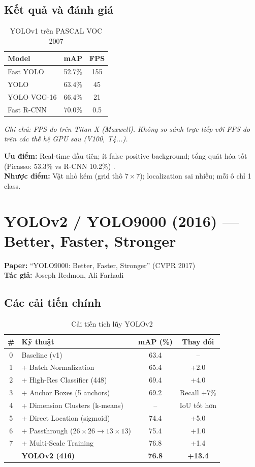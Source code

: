 \subsection{Kết quả và đánh giá}
\begin{table}[H]\centering
\caption{YOLOv1 trên PASCAL VOC 2007}
\begin{tabular}{lcc}\toprule
\textbf{Model} & \textbf{mAP} & \textbf{FPS} \\\midrule
Fast YOLO & 52.7\% & 155 \\
YOLO & 63.4\% & 45 \\
YOLO VGG-16 & 66.4\% & 21 \\
Fast R-CNN & 70.0\% & 0.5 \\\bottomrule
\end{tabular}
\end{table}

\textit{Ghi chú: FPS đo trên Titan X (Maxwell). Không so sánh trực tiếp với FPS đo trên các thế hệ GPU sau (V100, T4...).}

\textbf{Ưu điểm:} Real-time đầu tiên; ít false positive background; tổng quát hóa tốt (Picasso: 53.3\% vs R-CNN 10.2\%) \cite{yolov1}.\\
\textbf{Nhược điểm:} Vật nhỏ kém (grid thô $7 \times 7$); localization sai nhiều; mỗi ô chỉ 1 class.

\section{YOLOv2 / YOLO9000 (2016) --- Better, Faster, Stronger}
\textbf{Paper:} ``YOLO9000: Better, Faster, Stronger'' (CVPR 2017) \cite{yolov2}\\
\textbf{Tác giả:} Joseph Redmon, Ali Farhadi

\subsection{Các cải tiến chính}
\begin{table}[H]\centering
\caption{Cải tiến tích lũy YOLOv2}
\begin{tabular}{clcc}\toprule
\# & \textbf{Kỹ thuật} & \textbf{mAP (\%)} & \textbf{Thay đổi}\\\midrule
0 & Baseline (v1) & 63.4 & -- \\
1 & + Batch Normalization & 65.4 & +2.0 \\
2 & + High-Res Classifier (448) & 69.4 & +4.0 \\
3 & + Anchor Boxes (5 anchors) & 69.2 & Recall +7\% \\
4 & + Dimension Clusters (k-means) & -- & IoU tốt hơn \\
5 & + Direct Location (sigmoid) & 74.4 & +5.0 \\
6 & + Passthrough ($26 \times 26 \rightarrow 13 \times 13$) & 75.4 & +1.0 \\
7 & + Multi-Scale Training & 76.8 & +1.4 \\
\midrule
& \textbf{YOLOv2 (416)} & \textbf{76.8} & \textbf{+13.4} \\\bottomrule
\end{tabular}
\end{table}


